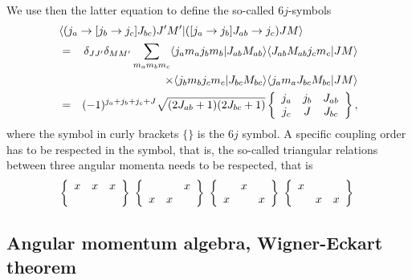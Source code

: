 \documentclass[%
twoside,                 %
final,                   %
10pt]{article}
\begin{document}
\paragraph{}
We use then the latter equation to define the so-called $6j$-symbols
\begin{eqnarray}
\nonumber
\lefteqn{ \langle (j_a\rightarrow [j_b\rightarrow j_c]J_{bc}) J'M'| ([j_a\rightarrow j_b]J_{ab}\rightarrow j_c) JM\rangle } \\ \nonumber
&= & \delta_{JJ'}\delta_{MM'}\sum_{m_am_bm_c}\langle j_am_aj_bm_b|J_{ab}M_{ab}\rangle \langle J_{ab}M_{ab}j_cm_c|JM\rangle \\ \nonumber
& &  \times \langle j_bm_bj_cm_c|J_{bc}M_{bc}\rangle \langle j_am_aJ_{bc}M_{bc}|JM\rangle  \\ \nonumber
&= & (-1)^{j_a+j_b+j_c+J}\sqrt{(2J_{ab}+1)(2J_{bc}+1)}\left\{\begin{array}{ccc} j_a & j_b& J_{ab} \\ j_c & J & J_{bc} \end{array}\right\}
, \nonumber
\end{eqnarray}
where the symbol in curly brackets $\{\}$ is the $6j$ symbol. 
A specific coupling order has to be respected in the symbol, that is, the so-called triangular relations between three angular momenta needs to be respected, that is 
\[
\left\{\begin{array}{ccc} x & x& x \\  &  &  \end{array}\right\}\hspace{0.1cm}\left\{\begin{array}{ccc}  & & x \\  x& x &  \end{array}\right\}\hspace{0.1cm}\left\{\begin{array}{ccc}  & x&  \\ x &  &x  \end{array}\right\}\hspace{0.1cm}\left\{\begin{array}{ccc} x & &  \\  & x &x  \end{array}\right\}\hspace{0.1cm}
\]



\subsection*{Angular momentum algebra, Wigner-Eckart theorem}
\end{document}
